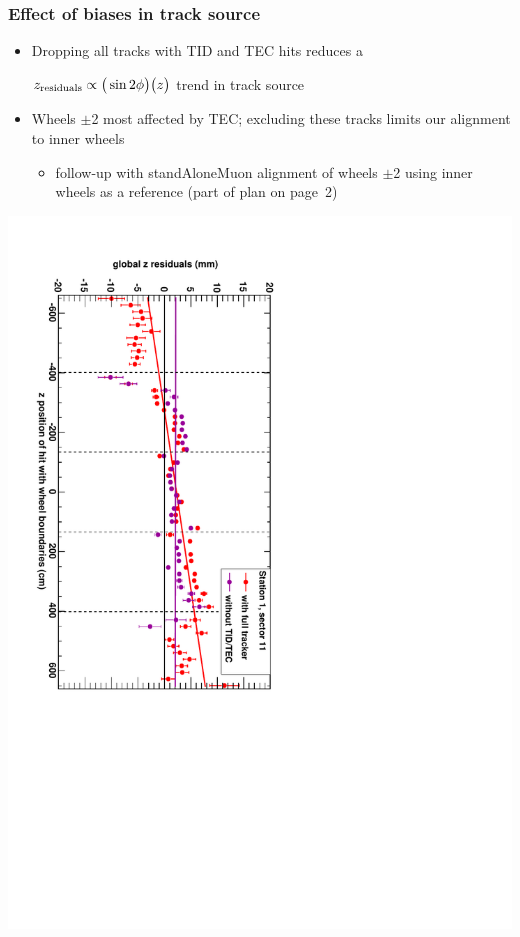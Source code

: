 \documentclass[compress]{beamer}
\begin{document}
\begin{frame}
\frametitle{Effect of biases in track source}
\begin{itemize}
\item Dropping all tracks with TID and TEC hits reduces a

\vspace{0.1 cm}
$z_{\mbox{\scriptsize residuals}} \propto \big(\sin 2\phi\big) \big(z\big)$ trend in track source

\vspace{0.1 cm}
\item Wheels $\pm$2 most affected by TEC; excluding these tracks limits our alignment to inner wheels
\begin{itemize}
\item follow-up with standAloneMuon alignment of wheels $\pm$2 using inner wheels as a reference (part of plan on page~2)
\end{itemize}
\end{itemize}
\begin{center}
\includegraphics[height=0.9\linewidth, angle=90]{trackbias_demo.pdf}
\end{center}
\end{frame}
\end{document}
